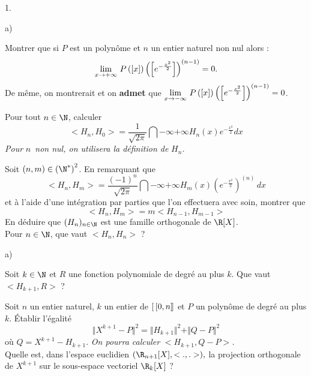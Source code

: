 \documentclass[11pt]{article}%
\begin{document}
\begin{noliste}{1.}
 \setlength{\itemsep}{4mm}
\item 

\begin{noliste}{a)}
 \setlength{\itemsep}{2mm}
\item Montrer que si $P$ est un polynôme et $n$ un entier naturel non
nul
alors :
\[
{\displaystyle \lim_{x\rightarrow + \infty } \ }P\left(\left[ {x} \right]\right)\left(\left[ {
e^{-\frac{x^{2}}{2}}} \right]\right)
^{(n-1)} = 0.
\]
De même, on montrerait et on \textbf{admet} que ${\displaystyle \lim_{x\rightarrow
-\infty } \ }P\left(\left[ {x} \right]\right)\left(\left[ { e^{-\frac{x^{2}}{2}}} \right]\right)
^{(n-1)} = 0$.

\item Pour tout $n\in \N$, calculer 
\[
<H_{n},H_{0}> = {\dfrac{1}{\sqrt{2\pi }}}\dint{-\infty }{+ \infty
}H_{n}(x)e^{-\frac{x^{2}}{2}}dx
\]
\textit{Pour }$n$\textit{\ non nul, on utilisera la définition de
}$H_{n}$\textit{.}

\item Soit $(n,m)\in \left( \N^{\ast }\right) ^{2}$. En remarquant
que 
\[
<H_{n},H_{m}> = {\dfrac{(-1)^{n}}{\sqrt{2\pi }}}\dint{-\infty
}{+ \infty }H_{m}(x)\left( e^{-\frac{x^{2}}{2}}\right) ^{(n)}\,dx
\]
et à l'aide d'une intégration par parties que l'on effectuera avec
soin,
montrer que 
\[
<H_{n},H_{m}> = m<H_{n-1},H_{m-1}>
\]
En déduire que $(H_{n})_{n\in \N}$ est une famille orthogonale de
$\R[X]$.\\
Pour $n\in \N$, que vaut $<H_{n},H_{n}>$ ?
\end{noliste}

\item 

\begin{noliste}{a)}
 \setlength{\itemsep}{2mm}
\item Soit $k\in \N$ et $R$ une fonction polynomiale de degré au
plus $k$. Que vaut $<H_{k + 1},R>$ ?

\item Soit $n$ un entier naturel, $k$ un entier de ${[ \
\hspace{-0.15em}[0,n]\hspace{-0.13em}]}$ et $P$ un polynôme de degré au
plus $k$. Établir l'égalité 
\[
\Vert X^{k + 1}-P\Vert ^{2} = \Vert H_{k + 1}\Vert ^{2} + \Vert
Q-P\Vert ^{2}
\]
o{ù} $Q = X^{k + 1}-H_{k + 1}$. \textit{On pourra calculer }$<H_{k +
1},Q-P>$\textit{.}\\
Quelle est, dans l'espace euclidien $(\R_{n + 1}[X],<.,.>),$ la
projection orthogonale de $X^{k + 1}$ sur le sous-espace vectoriel
$\R_{k}[X]$ ?


\end{noliste}
\end{noliste}
\end{document}
